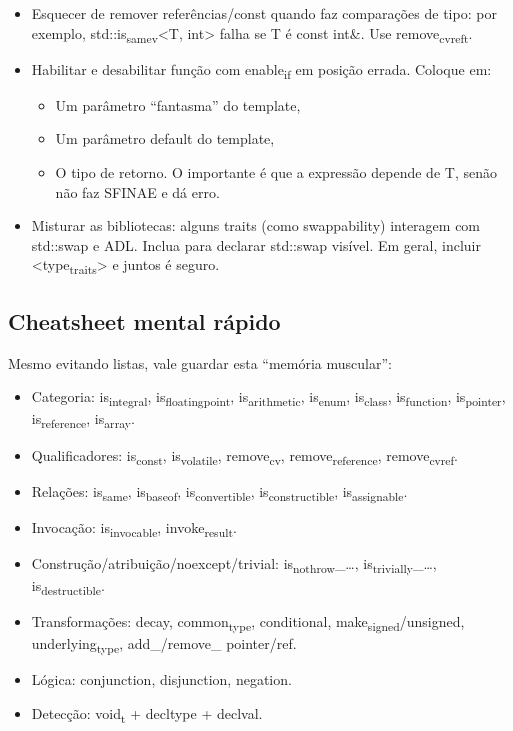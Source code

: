 \documentclass[11pt]{article}
\begin{document}
\begin{itemize}
\item Esquecer de remover referências/const quando faz comparações de tipo: por exemplo, std::is\textsubscript{same}\textsubscript{v}<T, int> falha se T é const int\&. Use remove\textsubscript{cvref}\textsubscript{t}.
\item Habilitar e desabilitar função com enable\textsubscript{if} em posição errada. Coloque em:
\begin{itemize}
\item Um parâmetro “fantasma” do template,
\item Um parâmetro default do template,
\item O tipo de retorno. O importante é que a expressão depende de T, senão não faz SFINAE e dá erro.
\end{itemize}
\item Misturar as bibliotecas: alguns traits (como swappability) interagem com std::swap e ADL. Inclua para declarar std::swap visível. Em geral, incluir <type\textsubscript{traits}> e juntos é seguro.
\end{itemize}
\subsection{Cheatsheet mental rápido}
\label{sec:orgebae0f0}

Mesmo evitando listas, vale guardar esta “memória muscular”:
\begin{itemize}
\item Categoria: is\textsubscript{integral}, is\textsubscript{floating}\textsubscript{point}, is\textsubscript{arithmetic}, is\textsubscript{enum}, is\textsubscript{class}, is\textsubscript{function}, is\textsubscript{pointer}, is\textsubscript{reference}, is\textsubscript{array}.
\item Qualificadores: is\textsubscript{const}, is\textsubscript{volatile}, remove\textsubscript{cv}, remove\textsubscript{reference}, remove\textsubscript{cvref}.
\item Relações: is\textsubscript{same}, is\textsubscript{base}\textsubscript{of}, is\textsubscript{convertible}, is\textsubscript{constructible}, is\textsubscript{assignable}.
\item Invocação: is\textsubscript{invocable}, invoke\textsubscript{result}.
\item Construção/atribuição/noexcept/trivial: is\textsubscript{nothrow}\_\ldots{}, is\textsubscript{trivially}\_\ldots{}, is\textsubscript{destructible}.
\item Transformações: decay, common\textsubscript{type}, conditional, make\textsubscript{signed}/unsigned, underlying\textsubscript{type}, add\_/remove\_ pointer/ref.
\item Lógica: conjunction, disjunction, negation.
\item Detecção: void\textsubscript{t} + decltype + declval.
\end{itemize}
\end{document}
